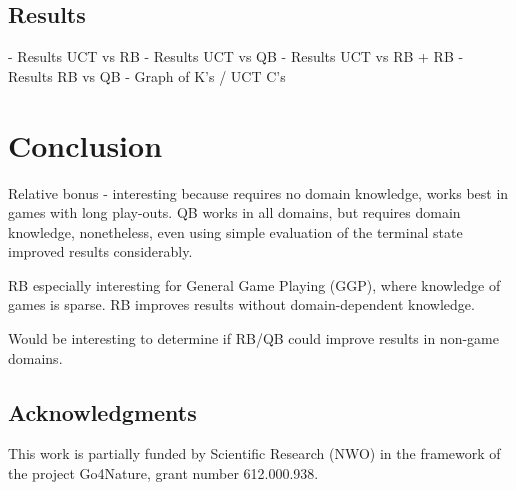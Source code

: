\documentclass{ecai2010}
\begin{document}
\subsection{Results}
- Results UCT vs RB
- Results UCT vs QB
- Results UCT vs RB + RB
- Results RB vs QB
- Graph of K's / UCT C's

\section{Conclusion}
Relative bonus - interesting because requires no domain knowledge, works best in games with long play-outs.
QB works in all domains, but requires domain knowledge, nonetheless, even using simple evaluation of the terminal state improved results considerably.

RB especially interesting for General Game Playing (GGP), where knowledge of games is sparse. RB improves results without domain-dependent knowledge.

Would be interesting to determine if RB/QB could improve results in non-game domains.

\subsection*{Acknowledgments}
This work is partially funded by Scientific Research (NWO) in the framework of the project Go4Nature, grant number 612.000.938.

\end{document}
